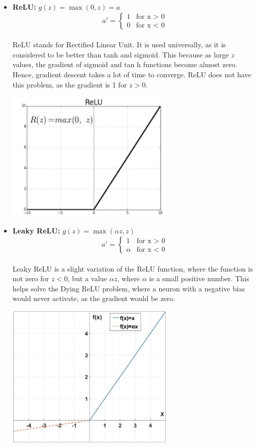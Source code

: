 \documentclass[12pt]{article}
\begin{document}
\begin{itemize}
    \item \textbf{ReLU: }$g(z) = \max(0,z)=a$\\
    \begin{equation*}
        a' =
          \begin{cases}
            1 & \text{for x $>$ 0}\\
            0 & \text{for x $<$ 0}
          \end{cases}       
      \end{equation*}
    \\ReLU stands for Rectified Linear Unit. It is used universally, as it is considered to be better than tanh and sigmoid. This because as large $z$ values, the gradient of sigmoid and tan h functions become almost zero. Hence, gradient descent takes a lot of time to converge. ReLU does not have this problem, as the gradient is 1 for $z>0$.
        \begin{center}
            \includegraphics[width=8cm]{relu2.png}
        \end{center} 
    \item \textbf{Leaky ReLU: }$g(z) = \max(\alpha z,z)$\\
    \begin{equation*}
    a' =
      \begin{cases}
        1 & \text{for x $>$ 0}\\
        \alpha & \text{for x $<$ 0}
      \end{cases}       
  \end{equation*}   
    \\Leaky ReLU is a slight variation of the ReLU function, where the function is not zero for $z<0$, but a value $\alpha z$, where $\alpha$ is a small positive number. This helps solve the Dying ReLU problem, where a neuron with a negative bias would never activate, as the gradient would be zero.
        \begin{center}
            \includegraphics[width=8cm]{leaky-relu.png}

\end{center}
\end{itemize}
\end{document}
